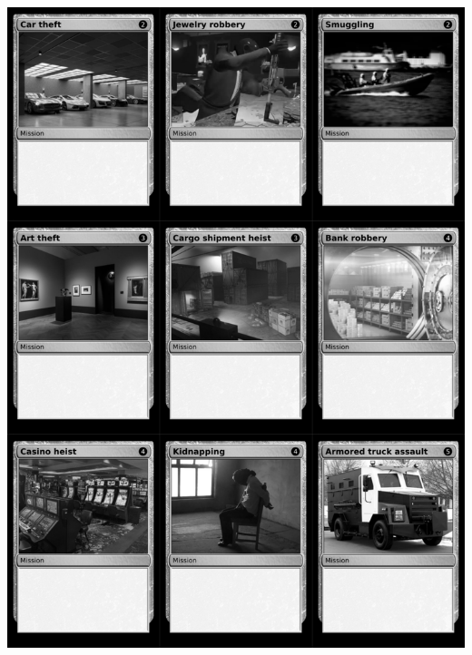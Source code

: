 \documentclass[a4paper]{article}
\begin{document}
\newpage

\begin{center}
	\centering
	\includegraphics[width=200.5mm,height=280.7mm]{output/temp/page35.png}
\end{center}
\end{document}
